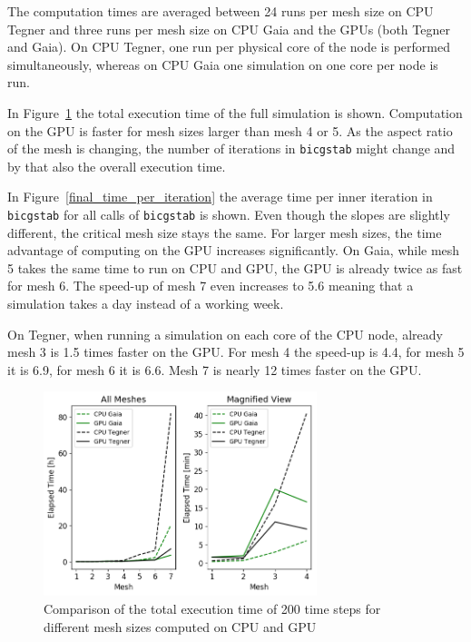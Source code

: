\documentclass[11pt]{article}
\begin{document}
The computation times are averaged between 24 runs per mesh size on CPU Tegner and three runs per mesh size on CPU Gaia and the GPUs (both Tegner and Gaia). On CPU Tegner, one run per physical core of the node is performed simultaneously, whereas on CPU Gaia one simulation on one core per node is run.

In Figure~\ref{final_total_time} the total execution time of the full simulation is shown. Computation on the GPU is faster for mesh sizes larger than mesh 4 or 5. As the aspect ratio of the mesh is changing, the number of iterations in \texttt{bicgstab} might change and by that also the overall execution time.

In Figure~\ref{final_time_per_iteration} the average time per inner iteration in \texttt{bicgstab} for all calls of \texttt{bicgstab} is shown. Even though the slopes are slightly different, the critical mesh size stays the same. For larger mesh sizes, the time advantage of computing on the GPU increases significantly. On Gaia, while mesh 5 takes the same time to run on CPU and GPU, the GPU is already twice as fast for mesh 6. The speed-up of mesh 7 even increases to 5.6 meaning that a simulation takes a day instead of a working week.

On Tegner, when running a simulation on each core of the CPU node, already mesh 3 is 1.5 times faster on the GPU. For mesh 4 the speed-up is 4.4, for mesh 5 it is 6.9, for mesh 6 it is 6.6. Mesh 7 is nearly 12 times faster on the GPU.

\begin{figure}[H]
    \centering
    \includegraphics[width=0.71\textwidth]{Comparison_total_time.png}
    \caption{Comparison of the total execution time of 200 time steps for different mesh sizes computed on CPU and GPU}
    \label{final_total_time}
\end{figure}
\end{document}
